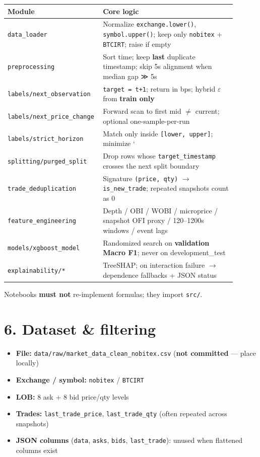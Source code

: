 \documentclass[11pt,a4paper]{article}
\begin{document}
\begin{center}
\begin{tabular}{L{0.32\linewidth}L{0.58\linewidth}}
\toprule
Module & Core logic \\
\midrule
\texttt{data\_loader} & Normalize \texttt{exchange.lower()}, \texttt{symbol.upper()}; keep only \texttt{nobitex} + \texttt{BTCIRT}; raise if empty \\
\texttt{preprocessing} & Sort time; keep \textbf{last} duplicate timestamp; skip 5s alignment when median gap ≫ 5s \\
\texttt{labels/next\_observation} & \texttt{target = t+1}; return in bps; hybrid $\varepsilon$ from \textbf{train only} \\
\texttt{labels/next\_price\_change} & Forward scan to first mid $\ne$ current; optional one-sample-per-run \\
\texttt{labels/strict\_horizon} & Match only inside \texttt{[lower, upper]}; minimize ` \\
\texttt{splitting/purged\_split} & Drop rows whose \texttt{target\_timestamp} crosses the next split boundary \\
\texttt{trade\_deduplication} & Signature \texttt{(price, qty)} $\rightarrow$ \texttt{is\_new\_trade}; repeated snapshots count as 0 \\
\texttt{feature\_engineering} & Depth / OBI / WOBI / microprice / snapshot OFI proxy / 120--1200s windows / event lags \\
\texttt{models/xgboost\_model} & Randomized search on \textbf{validation Macro F1}; never on development\_test \\
\texttt{explainability/*} & TreeSHAP; on interaction failure $\rightarrow$ dependence fallbacks + JSON status \\
\bottomrule
\end{tabular}
\end{center}
\vspace{0.35em}

Notebooks \textbf{must not} re-implement formulas; they import \texttt{src/}.


\vspace{0.5em}

\section{6. Dataset \& filtering}

\begin{itemize}
\item \textbf{File:} \texttt{data/raw/market\_data\_clean\_nobitex.csv} (\textbf{not committed} --- place locally)
\item \textbf{Exchange / symbol:} \texttt{nobitex} / \texttt{BTCIRT}
\item \textbf{LOB:} 8 ask + 8 bid price/qty levels
\item \textbf{Trades:} \texttt{last\_trade\_price}, \texttt{last\_trade\_qty} (often repeated across snapshots)
\item \textbf{JSON columns} (\texttt{data}, \texttt{asks}, \texttt{bids}, \texttt{last\_trade}): unused when flattened columns exist
\end{itemize}
\end{document}
